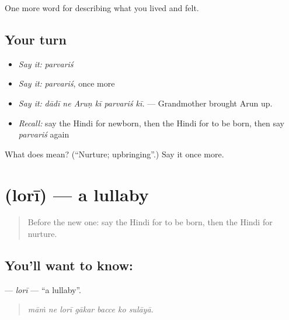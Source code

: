 \begin{grammarlens}[title={What you've built}]
One more word for describing what you lived and felt.
\end{grammarlens}

\subsection*{Your turn}
\begin{itemize}
\raggedright
  \item \emph{Say it:} \emph{parvariś}
  \item \emph{Say it:} \emph{parvariś}, once more
  \item \emph{Say it:} \emph{dādī ne Aruṇ kī parvariś kī.} — Grandmother brought Arun up.
  \item \emph{Recall:} say the Hindi for newborn, then the Hindi for to be born, then say \emph{parvariś} again
\end{itemize}

\begin{tcolorbox}[breakable,colback=teal!4,colframe=teal!35!black,title={Before you move on}]
What does  mean? (\textquotedblleft{}Nurture; upbringing\textquotedblright{}.) Say it once more.
\end{tcolorbox}
\section[\texorpdfstring{\hi{लोरी} (lorī)}{लोरी (lorī)}]{ (lorī) — a lullaby}

\label{lesson:HI-C498-lori}



\begin{quote}
Before the new one: say the Hindi for to be born, then the Hindi for nurture.
\end{quote}

\subsection*{You'll want to know: }
\textbf{} — \emph{lorī} — \textquotedblleft{}a lullaby\textquotedblright{}.

\begin{quote}
      
\end{quote}

\begin{quote}
\emph{māṁ ne lorī gākar bacce ko sulāyā.}
\end{quote}

